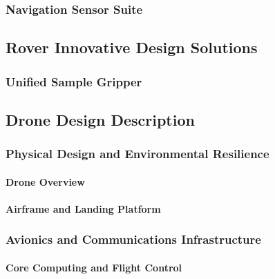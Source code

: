 \subsubsection{Navigation Sensor Suite}
\label{subsubsec:navigation_sensor_suite}


\subsection{Rover Innovative Design Solutions}
\label{subsec:rover_innovations}

\subsubsection{Unified Sample Gripper}
\label{subsubsec:unified_sample_gripper}


\subsection{Drone Design Description}
\label{subsec:drone_design_description}

\subsubsection{Physical Design and Environmental Resilience}
\label{subsubsec:drone_physical_design}

\paragraph{Drone Overview}
\label{par:drone_overview}


\paragraph{Airframe and Landing Platform}
\label{par:drone_airframe_landing_platform}



\subsubsection{Avionics and Communications Infrastructure}
\label{subsubsec:drone_avionics_communications}

\paragraph{Core Computing and Flight Control}
\label{par:drone_core_computing_flight_control}


